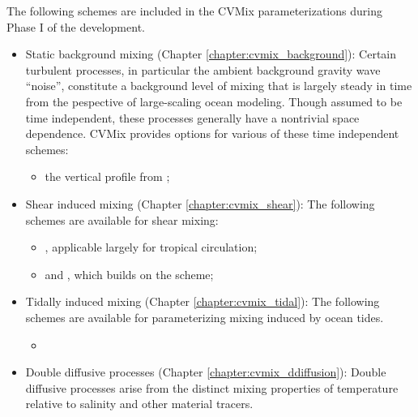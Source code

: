 The following schemes are included in the CVMix parameterizations
during Phase I of the development.
\begin{itemize}

\item {\sc Static background mixing} (Chapter
  \ref{chapter:cvmix_background}): Certain turbulent processes, in
  particular the ambient background gravity wave ``noise'', constitute
  a background level of mixing that is largely steady in time from the
  pespective of large-scaling ocean modeling.  Though assumed to be
  time independent, these processes generally have a nontrivial space
  dependence.  CVMix provides options for various of these time
  independent schemes:
\begin{itemize}
\item the vertical profile from \cite{BryanLewis1979};
\end{itemize}


\item {\sc Shear induced mixing} (Chapter \ref{chapter:cvmix_shear}):
  The following schemes are available for shear mixing:
 \begin{itemize}
 \item \cite{PPvmix}, applicable largely for tropical circulation;
 \item \cite{LargeKPP} and \cite{Large_Gent1999}, which builds on the
   \cite{PPvmix} scheme;
  \end{itemize}


\item {\sc Tidally induced mixing} (Chapter
  \ref{chapter:cvmix_tidal}): The following schemes are available for
  parameterizing mixing induced by ocean tides.
  \begin{itemize}
   \item \cite{Simmonsetal2004} 
\end{itemize}


\item {\sc Double diffusive processes} (Chapter
  \ref{chapter:cvmix_ddiffusion}): Double diffusive processes arise
  from the distinct mixing properties of temperature relative to
  salinity and other material tracers.


\end{itemize}
